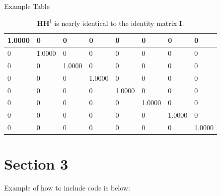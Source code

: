 \documentclass{article}
\begin{document}
Example Table
\begin{table}[H]
    \begin{center}
        \begin{tabular}{| l | l | l | l | l | l | l | l |}
            \hline
            1.0000 & 0 & 0 & 0 & 0 & 0 & 0 & 0 \\
            \hline
            0 & 1.0000 & 0 & 0 & 0 & 0 & 0 & 0 \\
            \hline
            0 & 0 & 1.0000 & 0 & 0 & 0 & 0 & 0 \\
            \hline
            0 & 0 & 0 & 1.0000 & 0 & 0 & 0 & 0 \\
            \hline
            0 & 0 & 0 & 0 & 1.0000 & 0 & 0 & 0 \\
            \hline
            0 & 0 & 0 & 0 & 0 & 1.0000 & 0 & 0 \\
            \hline
            0 & 0 & 0 & 0 & 0 & 0 & 1.0000 & 0 \\
            \hline
            0 & 0 & 0 & 0 & 0 & 0 & 0 & 1.0000 \\
            \hline
        \end{tabular}
    \end{center}
    \caption{$\textbf{HH}^{\dagger}$ is nearly identical to the identity matrix $\textbf{I}$.}
\end{table}

\section{Section 3}
Example of how to include code is below:

\end{document}

